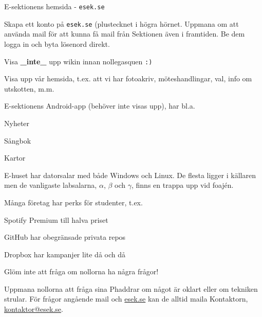 \documentclass[10pt]{article}
\begin{document}
\begin{dashlist}
        \newpage

        \item E-sektionens hemsida - \texttt{esek.se}
        \begin{dashlist}
            \item Skapa ett konto på \texttt{esek.se} (plustecknet i högra hörnet. Uppmana om att använda mail för att kunna få mail från Sektionen även i framtiden. Be dem logga in och byta lösenord direkt.
            \item Visa \textbf{\_inte\_} upp wikin innan nollegasquen \texttt{:)}
            \item Visa upp vår hemsida, t.ex. att vi har fotoakriv, möteshandlingar, val, info om utskotten, m.m.
        \end{dashlist}

        \item E-sektionens Android-app (behöver inte visas upp), har bl.a.
        \begin{dashlist}
            \item Nyheter
            \item Sångbok
            \item Kartor
        \end{dashlist}

        \item E-huset har datorsalar med både Windows och Linux. De flesta ligger i källaren men de vanligaste labsalarna, $\alpha$, $\beta$ och $\gamma$, finns en trappa upp vid foajén.

        \item Många företag har perks för studenter, t.ex.
        \begin{dashlist}
            \item Spotify Premium till halva priset
            \item GitHub har obegränsade privata repos
            \item Dropbox har kampanjer lite då och då
        \end{dashlist}

        \item Glöm inte att fråga om nollorna ha några frågor!

        \item Uppmana nollorna att fråga sina Phaddrar om något är oklart eller om tekniken strular. För frågor angående mail och \url{esek.se} kan de alltid maila Kontaktorn, \url{kontaktor@esek.se}.
    \end{dashlist}
\end{document}
